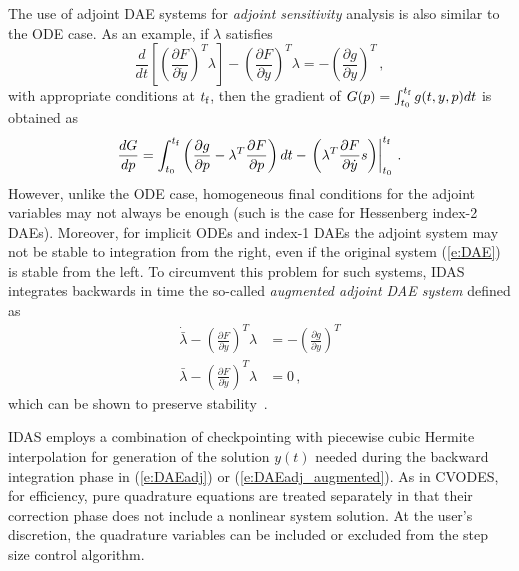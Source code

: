 The use of adjoint DAE systems for {\em adjoint sensitivity} analysis is also
similar to the ODE case. As an example, if $\lambda$ satisfies
\begin{equation}\label{e:DAEadj}
  \frac{d}{dt} \left[ \left( \frac{\partial F}{\partial \dot{y}}\right) ^T \lambda \right]
  - \left(\frac{\partial F}{\partial y}\right)^T \lambda
  = - \left( \frac{\partial g}{\partial y}\right)^T \, ,
\end{equation}
with appropriate conditions at $t_{\mbox{\scriptsize f}}$, then the gradient of
$G(p) = \int_{t_0}^{t_{\mbox{\tiny f}}} g(t,y,p) dt$ is obtained as
\begin{equation*}
  \frac{dG}{dp} =
  \int_{t_0}^{t_{\mbox{\tiny f}}} \left(
    \frac{\partial g}{\partial p} - \lambda^T \frac{\partial F}{\partial p}
  \right) dt
  - \left.\left(
      \lambda^T \frac{\partial F}{\partial \dot{y}} s
    \right)\right|_{t_0}^{t_{\mbox{\tiny f}}} \, .
\end{equation*}
However, unlike the ODE case, homogeneous final conditions for the
adjoint variables may not always be enough (such is the case for
Hessenberg index-2 DAEs).
%
Moreover, for implicit ODEs and index-1 DAEs the adjoint system may not
be stable to integration from the right, even if the original system (\ref{e:DAE})
is stable from the left. To circumvent this problem for such
systems, IDAS integrates backwards in time the so-called
{\em augmented adjoint DAE system} defined as
\begin{equation} \label{e:DAEadj_augmented}
\begin{split}
  \dot {\bar\lambda} -  \left(\frac{\partial F}{\partial y}\right)^T \lambda
  &  = - \left( \frac{\partial g}{\partial y}\right)^T \\
  \bar \lambda - \left( \frac{\partial F}{\partial \dot{y}}\right) ^T \lambda
  & = 0 \, ,
\end{split}
\end{equation}
which can be shown to preserve stability~\cite{CLPS:03}.

IDAS employs a combination of checkpointing with piecewise cubic Hermite
interpolation for generation of the solution $y(t)$ needed during the
backward integration phase in (\ref{e:DAEadj}) or (\ref{e:DAEadj_augmented}).
As in CVODES, for efficiency, pure quadrature equations are treated separately
in that their correction phase does not include a nonlinear system solution.
At the user's discretion, the quadrature variables can be included or excluded
from the step size control algorithm.

